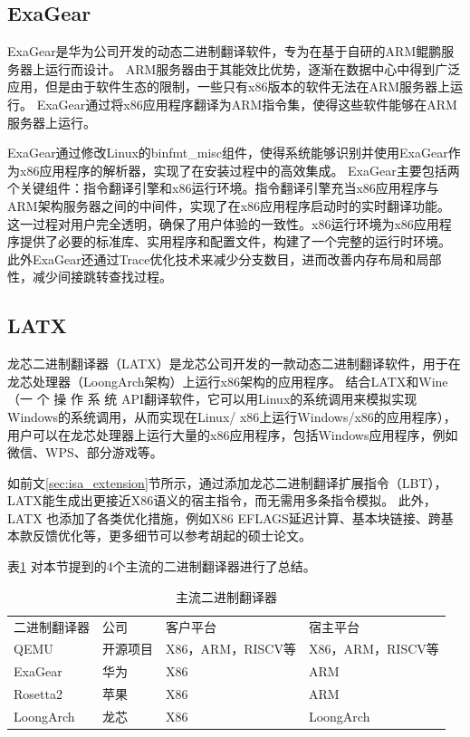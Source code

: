 \subsection{ExaGear}

ExaGear是华为公司开发的动态二进制翻译软件，专为在基于自研的ARM鲲鹏服务器上运行而设计。
ARM服务器由于其能效比优势，逐渐在数据中心中得到广泛应用，但是由于软件生态的限制，一些只有x86版本的软件无法在ARM服务器上运行。
ExaGear通过将x86应用程序翻译为ARM指令集，使得这些软件能够在ARM服务器上运行。

ExaGear通过修改Linux的binfmt\_misc组件，使得系统能够识别并使用ExaGear作为x86应用程序的解析器，实现了在安装过程中的高效集成。
ExaGear主要包括两个关键组件：指令翻译引擎和x86运行环境。指令翻译引擎充当x86应用程序与ARM架构服务器之间的中间件，实现了在x86应用程序启动时的实时翻译功能。
这一过程对用户完全透明，确保了用户体验的一致性。x86运行环境为x86应用程序提供了必要的标准库、实用程序和配置文件，构建了一个完整的运行时环境。
此外ExaGear还通过Trace优化技术来减少分支数目，进而改善内存布局和局部性，减少间接跳转查找过程\cite{LvYandong2021}。

\subsection{LATX}

龙芯二进制翻译器（LATX）是龙芯公司开发的一款动态二进制翻译软件，用于在龙芯处理器（LoongArch架构）上运行x86架构的应用程序。
结合LATX和Wine\cite{amstadt1994wine}（一 个 操 作 系 统 API翻译软件，它可以用Linux的系统调用来模拟实现Windows的系统调用，从而实现在Linux/ x86上运行Windows/x86的应用程序），
用户可以在龙芯处理器上运行大量的x86应用程序，包括Windows应用程序，例如微信、WPS、部分游戏等。

如前文\ref{sec:isa_extension}节所示，通过添加龙芯二进制翻译扩展指令（LBT），LATX能生成出更接近X86语义的宿主指令，而无需用多条指令模拟。
此外，LATX 也添加了各类优化措施，例如X86 EFLAGS延迟计算、基本块链接、跨基本款反馈优化等，更多细节可以参考胡起的硕士论文\cite{HuQi2023}。

表\ref{tab:BTs} 对本节提到的4个主流的二进制翻译器进行了总结。

\begin{table}[!htbp]
  \centering
  \caption{主流二进制翻译器}
  \label{tab:BTs}
    \begin{tabular}{llll}
    \rowcolor[HTML]{FBE5D6} 
    二进制翻译器    & 公司   & 客户平台           & 宿主平台           \\
    QEMU      & 开源项目 & X86，ARM，RISCV等 & X86，ARM，RISCV等  \\
    ExaGear   & 华为   & X86            & ARM            \\
    Rosetta2  & 苹果   & X86            & ARM            \\
    LoongArch & 龙芯   & X86            & LoongArch      
    \end{tabular}
    \end{table}

